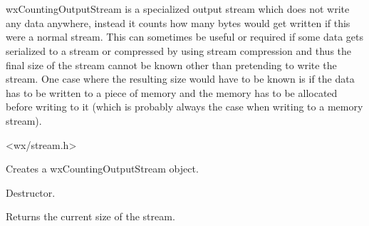 \section{}\label{wxcountingoutputstream}

wxCountingOutputStream is a specialized output stream which does not write any data anywhere,
instead it counts how many bytes would get written if this were a normal stream. This
can sometimes be useful or required if some data gets serialized to a stream or compressed
by using stream compression and thus the final size of the stream cannot be known other
than pretending to write the stream. One case where the resulting size would have to be
known is if the data has to be written to a piece of memory and the memory has to be
allocated before writing to it (which is probably always the case when writing to a 
memory stream).




<wx/stream.h>




\label{wxcountingoutputstreamctor}


Creates a wxCountingOutputStream object.

\label{wxcountingoutputstreamdtor}


Destructor.

\label{wxcountingoutputstreamgetsize}


Returns the current size of the stream.

